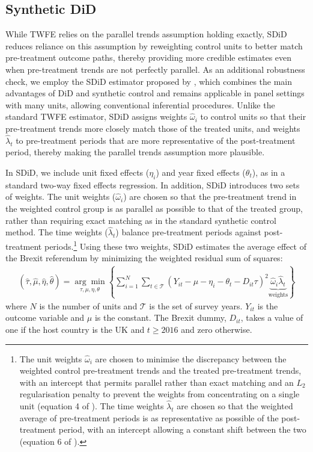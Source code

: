 \documentclass[preprint,11pt,authoryear]{elsarticle}
\begin{document}
\subsection{Synthetic DiD}

While TWFE relies on the parallel trends assumption holding exactly, SDiD reduces reliance on this assumption by reweighting control units to better match pre-treatment outcome paths, thereby providing more credible estimates even when pre-treatment trends are not perfectly parallel. As an additional robustness check, we employ the SDiD estimator proposed by \citet{arkhangelsky2021synthetic}, which combines the main advantages of DiD and synthetic control and remains applicable in panel settings with many units, allowing conventional inferential procedures.
Unlike the standard TWFE estimator, SDiD assigns weights $\hat{\omega}_{i}$ to control units so that their pre-treatment trends more closely match those of the treated units, and weights $\hat{\lambda}_{t}$ to pre-treatment periods that are more representative of the post-treatment period, thereby making the parallel trends assumption more plausible.

In SDiD, we include unit fixed effects ($\eta_{i}$) and year fixed effects ($\theta_{t}$), as in a standard two-way fixed effects regression. In addition, SDiD introduces two sets of weights. The unit weights ($\hat{\omega}_{i}$) are chosen so that the pre-treatment trend in the weighted control group is as parallel as possible to that of the treated group, rather than requiring exact matching as in the standard synthetic control method. The time weights ($\hat{\lambda}_{t}$) balance pre-treatment periods against post-treatment periods.\footnote{
The unit weights $\hat{\omega}_{i}$ are chosen to minimise the discrepancy between the weighted control pre-treatment trends and the treated pre-treatment trends, with an intercept that permits parallel rather than exact matching and an $L_{2}$ regularisation penalty to prevent the weights from concentrating on a single unit (equation 4 of \citealt{arkhangelsky2021synthetic}).
The time weights $\hat{\lambda}_{t}$ are chosen so that the weighted average of pre-treatment periods is as representative as possible of the post-treatment period, with an intercept allowing a constant shift between the two (equation 6 of \citealt{arkhangelsky2021synthetic}).
}
Using these two weights, SDiD estimates the average effect of the Brexit referendum by minimizing the weighted residual sum of squares:
\begin{align} \label{eq:SDiD}
\left(\hat{\tau}, \hat{\mu}, \hat{\eta}, \hat{\theta}\right)
=
\underset{\tau, \mu, \eta, \theta}{\arg \min }
\left\{\sum_{i=1}^{N} \sum_{t \in \mathcal{T}}
\left(Y_{i t}-\mu-\eta_{i}-\theta_{t}
-D_{i t} \tau \right)^{2}
\underbrace{\hat{\omega}_{i} \hat{\lambda}_{t}}_{\text{weights}}
\right\}
\end{align}
where $N$ is the number of units and $\mathcal{T}$ is the set of survey years. $Y_{it}$ is the outcome variable and $\mu$ is the constant.
The Brexit dummy, $D_{it}$, takes a value of one if the host country is the UK and $t \geq 2016$ and zero otherwise.
\end{document}
